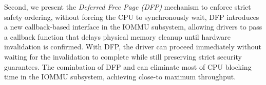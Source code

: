 


Second, 
we present the \emph{Deferred Free Page (DFP)} mechanism
    to enforce strict safety ordering, %
    without forcing the CPU to synchronously wait,
DFP introduces a new callback-based interface in the IOMMU subsystem,
    allowing drivers to pass a callback function
    that delays physical memory cleanup until hardware invalidation is confirmed.
With DFP, the driver can proceed immediately without waiting for the invalidation to complete
    while still preserving strict security guarantees.
The cominbation of DFP and \optOne{} can eliminate most of CPU blocking time
    in the IOMMU subsystem, achieving close-to maximum throughput.


